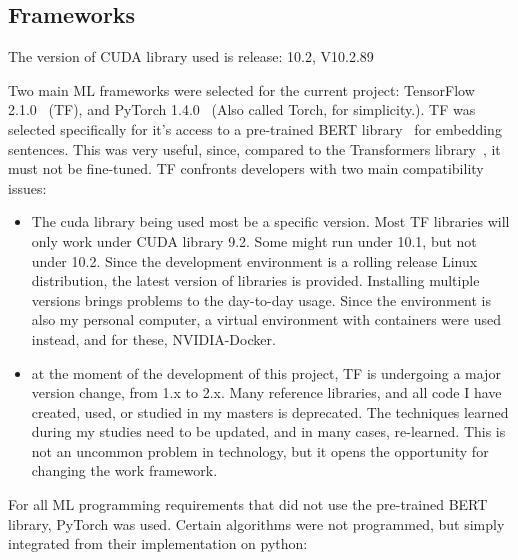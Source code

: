 \subsection{Frameworks}\label{sub:Frameworks}

The version of CUDA library used is release: 10.2, V10.2.89

Two main ML frameworks were selected for the current project: TensorFlow 2.1.0~\cite{tensorflow2015whitepaper} (TF), and PyTorch 1.4.0~\cite{pytorch2019} (Also called Torch, for simplicity.). TF was selected specifically for it's access to a pre-trained BERT library~\cite{lai2015bertembedding} for embedding sentences. This was very useful, since, compared to the Transformers library~\cite{wolf2019huggingface}, it must not be fine-tuned. TF confronts developers with two main compatibility issues:

\begin{itemize}
  \item The cuda library being used most be a specific version. Most TF libraries will only work under CUDA library 9.2. Some might run under 10.1, but not under 10.2. Since the development environment is a rolling release Linux distribution, the latest version of libraries is provided. Installing multiple versions brings problems to the day-to-day usage. Since the environment is also my personal computer, a virtual environment with containers were used instead, and for these, NVIDIA-Docker.

  \item at the moment of the development of this project, TF is undergoing a major version change, from 1.x to 2.x. Many reference libraries, and all code I have created, used, or studied in my masters is deprecated. The techniques learned during my studies need to be updated, and in many cases, re-learned.
  This is not an uncommon problem in technology, but it opens the opportunity for changing the work framework.
\end{itemize}

For all ML programming requirements that did not use the pre-trained BERT library, PyTorch was used. Certain algorithms were not programmed, but simply integrated from their implementation on python:


